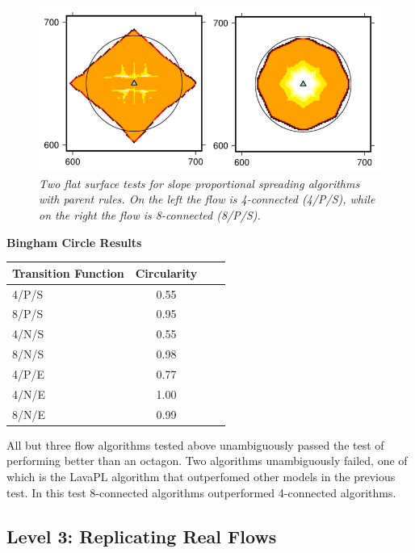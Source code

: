 \documentclass[12pt,letter]{article}
\begin{document}
		\begin{figure}[!h]
		\centering
		\includegraphics[width=0.7\linewidth]{figures/pancake}
		\caption{\textit{Two flat surface tests for slope proportional spreading algorithms with parent rules. On the left the flow is 4-connected (4/P/S), while on the right the flow is 8-connected (8/P/S).}}
		\label{fig:pancake}
	\end{figure}
	
		
		\begin{center}
			\textbf{Bingham Circle Results}\\
			\begin{tabular}{l c c c}
				\toprule
				Transition Function&Circularity\\
				\midrule
				4/P/S & 0.55\\
				8/P/S & 0.95\\
				4/N/S & 0.55\\
				8/N/S & 0.98\\
				4/P/E & 0.77\\
				4/N/E & 1.00\\
				8/N/E & 0.99\\
				
				\bottomrule
			\end{tabular}
		\end{center}
		
		All but three flow algorithms tested above unambiguously passed the test of performing better than an octagon. Two algorithms unambiguously failed, one of which is the LavaPL algorithm that outperfomed other models in the previous test. In this test 8-connected algorithms outperformed 4-connected algorithms.

	\subsection{Level 3: Replicating Real Flows}
	
\end{document}
